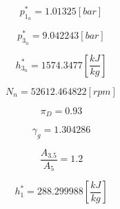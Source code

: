 \documentclass[titlepage]{article}
\begin{document}
\begin{equation}
  p_{1_{n}}^{*} =  1.01325 [bar]
\end{equation}

\begin{equation}
  p_{3_{n}}^{*} =  9.042243 [bar]
\end{equation}

\begin{equation}
  h_{3_{n}}^{*} =  1574.3477 \left[\frac{kJ}{kg}\right]
\end{equation}

\begin{equation}
  N_{n} = 52612.464822 [rpm]
\end{equation}

\begin{equation}
  \pi_{D} = 0.93
\end{equation}

\begin{equation}
  \gamma_{g} = 1.304286
\end{equation}

\begin{equation}
  \frac{A_{3.5}}{A_{5}} = 1.2
\end{equation}

\begin{equation}
  h_{1}^{*} = 288.299988 \left[\frac{kJ}{kg}\right]
\end{equation}
\end{document}
